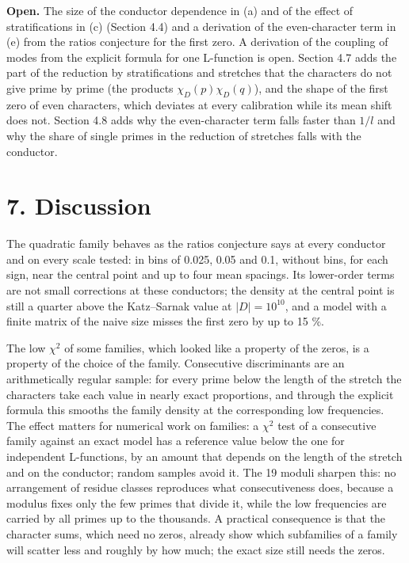 \documentclass[
  10pt,
]{article}
\begin{document}
\textbf{Open.} The size of the conductor dependence in (a) and of the
effect of stratifications in (c) (Section 4.4) and a derivation of the
even-character term in (e) from the ratios conjecture for the first
zero. A derivation of the coupling of modes from the explicit formula
for one L-function is open. Section 4.7 adds the part of the reduction
by stratifications and stretches that the characters do not give prime
by prime (the products \(\chi_D(p)\chi_D(q)\)), and the shape of the
first zero of even characters, which deviates at every calibration while
its mean shift does not. Section 4.8 adds why the even-character term
falls faster than \(1/l\) and why the share of single primes in the
reduction of stretches falls with the conductor.

\hypertarget{discussion}{%
\section{7. Discussion}\label{discussion}}

The quadratic family behaves as the ratios conjecture says at every
conductor and on every scale tested: in bins of 0.025, 0.05 and 0.1,
without bins, for each sign, near the central point and up to four mean
spacings. Its lower-order terms are not small corrections at these
conductors; the density at the central point is still a quarter above
the Katz--Sarnak value at \(|D| = 10^{10}\), and a model with a finite
matrix of the naive size misses the first zero by up to 15 \%.

The low \(\chi^2\) of some families, which looked like a property of the
zeros, is a property of the choice of the family. Consecutive
discriminants are an arithmetically regular sample: for every prime
below the length of the stretch the characters take each value in nearly
exact proportions, and through the explicit formula this smooths the
family density at the corresponding low frequencies. The effect matters
for numerical work on families: a \(\chi^2\) test of a consecutive
family against an exact model has a reference value below the one for
independent L-functions, by an amount that depends on the length of the
stretch and on the conductor; random samples avoid it. The 19 moduli
sharpen this: no arrangement of residue classes reproduces what
consecutiveness does, because a modulus fixes only the few primes that
divide it, while the low frequencies are carried by all primes up to the
thousands. A practical consequence is that the character sums, which
need no zeros, already show which subfamilies of a family will scatter
less and roughly by how much; the exact size still needs the zeros.
\end{document}
